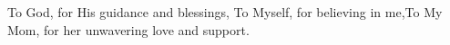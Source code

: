 
    To God, for His guidance and blessings, To Myself, for believing in me,To My Mom, for her unwavering love and support.
